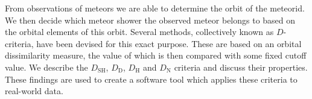 From observations of meteors we are able to determine the orbit of the meteorid. We then decide which meteor shower the observed meteor belongs to based on the orbital elements of this orbit. Several methods, collectively known as $D$-criteria, have been devised for this exact purpose. These are based on an orbital dissimilarity measure, the value of which is then compared with some fixed cutoff value. We describe the $D_\text{SH}$, $D_\text{D}$, $D_\text{H}$ and $D_\text{N}$ criteria and discuss their properties. These findings are used to create a software tool which applies these criteria to real-world data.